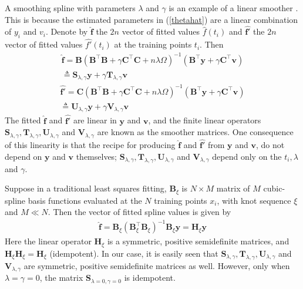 A smoothing spline with parameters $\lambda$ and $\gamma$ is an example of a linear smoother \cite{esl2009}. This is because the estimated parameters in (\ref{thetahat}) are a linear combination of $y_i$ and $v_i$. Denote by $\hat{\mathbf{f}}$ the $2n$ vector of fitted values $\hat{f}(t_i)$ and $\hat{\mathbf{f}'}$ the $2n$ vector of fitted values $\hat{f'}(t_i)$ at the training points $t_i$. Then
\begin{equation}
\begin{split}
\hat{\mathbf{f}} =\mathbf{B}(\mathbf{B}^\top\mathbf{B}+\gamma\mathbf{C}^\top\mathbf{C}+n\lambda\Omega)^{-1}(\mathbf{B}^\top\mathbf{y}+\gamma\mathbf{C}^\top\mathbf{v})\\
\triangleq \mathbf{S}_{\lambda,\gamma}\mathbf{y}+\gamma\mathbf{T}_{\lambda,\gamma}\mathbf{v} 
\end{split}
\end{equation}
\begin{equation}
\begin{split}
\hat{\mathbf{f}'}
=\mathbf{C}(\mathbf{B}^\top\mathbf{B}+\gamma\mathbf{C}^\top\mathbf{C}+n\lambda\Omega)^{-1}(\mathbf{B}^\top\mathbf{y}+\gamma\mathbf{C}^\top\mathbf{v})\\
\triangleq\mathbf{U}_{\lambda,\gamma}\mathbf{y}+\gamma\mathbf{V}_{\lambda,\gamma}\mathbf{v}
\end{split}
\end{equation}
The fitted $\hat{\mathbf{f}}$ and $\hat{\mathbf{f}'}$ are linear in $\mathbf{y}$ and $\mathbf{v}$, and the finite linear operators $\mathbf{S}_{\lambda,\gamma}, \mathbf{T}_{\lambda,\gamma}, \mathbf{U}_{\lambda,\gamma}$ and $\mathbf{V}_{\lambda,\gamma}$ are known as the smoother matrices. One consequence of this linearity is that the recipe for producing $\hat{\mathbf{f}}$ and $\hat{\mathbf{f}'}$ from $\mathbf{y}$ and $\mathbf{v}$, do not depend on $\mathbf{y}$ and $\mathbf{v}$ themselves; $\mathbf{S}_{\lambda,\gamma}, \mathbf{T}_{\lambda,\gamma}, \mathbf{U}_{\lambda,\gamma}$ and $\mathbf{V}_{\lambda,\gamma}$ depend only on the $t_i,\lambda$ and $\gamma$.

Suppose in a traditional least squares fitting, $\mathbf{B}_\xi$ is $N \times M$ matrix of $M$ cubic-spline basis functions evaluated at the $N$ training points $x_i$, with knot sequence $\xi$ and $M \ll N$. Then the vector of fitted spline values is given by
\begin{align}\label{fhy}
\hat{\mathbf{f}}=\mathbf{B}_\xi(\mathbf{B}^\top_\xi\mathbf{B}_\xi)^{-1}\mathbf{B}_\xi\mathbf{y}=\mathbf{H}_\xi\mathbf{y}
\end{align}
Here the linear operator $\mathbf{H}_\xi$ is a symmetric, positive semidefinite matrices, and $\mathbf{H}_\xi\mathbf{H}_\xi=\mathbf{H}_\xi$ (idempotent). In our case, it is easily seen that $\mathbf{S}_{\lambda,\gamma}, \mathbf{T}_{\lambda,\gamma}, \mathbf{U}_{\lambda,\gamma}$ and $\mathbf{V}_{\lambda,\gamma}$ are symmetric, positive semidefinite matrices as well. However, only when $\lambda=\gamma=0$, the matrix $\mathbf{S}_{\lambda=0,\gamma=0}$ is idempotent.


